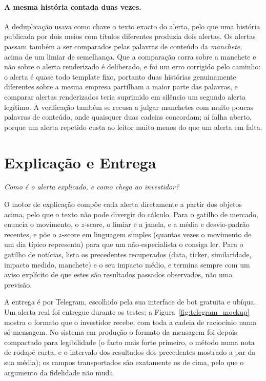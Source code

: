 \paragraph{A mesma história contada duas vezes.} A deduplicação usava como chave o texto exacto do
alerta, pelo que uma história publicada por dois meios com títulos diferentes produzia dois alertas.
Os alertas passam também a ser comparados pelas palavras de conteúdo da \emph{manchete}, acima de um
limiar de semelhança. Que a comparação corra sobre a manchete e não sobre o alerta renderizado é
deliberado, e foi um erro corrigido pelo caminho: o alerta é quase todo template fixo, portanto duas
histórias genuinamente diferentes sobre a mesma empresa partilham a maior parte das palavras, e
comparar alertas renderizados teria suprimido em silêncio um segundo alerta legítimo. A verificação
também se recusa a julgar manchetes com muito poucas palavras de conteúdo, onde quaisquer duas
cadeias concordam; aí falha aberto, porque um alerta repetido custa ao leitor muito menos do que um
alerta em falta.

\section{Explicação e Entrega}
\label{sec:investigator_xai}

\emph{Como é o alerta explicado, e como chega ao investidor?}

O motor de explicação compõe cada alerta diretamente a partir dos objetos acima, pelo que o texto não pode
divergir do cálculo. Para o gatilho de mercado, enuncia o movimento, o $z$-score, o limiar e a janela, e a
média e desvio-padrão recentes, e põe o $z$-score em linguagem simples (quantas vezes o movimento de um dia
típico representa) para que um não-especialista o consiga ler. Para o gatilho de notícias, lista os
precedentes recuperados (data, ticker, similaridade, impacto medido, manchete) e o seu impacto médio, e
termina sempre com um aviso explícito de que estes são resultados passados observados, não uma previsão.

A entrega é por Telegram, escolhido pela sua interface de bot gratuita e ubíqua. Um alerta real foi entregue
durante os testes; a Figura~\ref{fig:telegram_mockup} mostra o formato que o investidor recebe, com toda a
cadeia de raciocínio numa só mensagem. No sistema em produção o formato da mensagem foi depois compactado
para legibilidade (o facto mais forte primeiro, o método numa nota de rodapé curta, e o intervalo dos
resultados dos precedentes mostrado a par da sua média); os campos transportados são exatamente os de cima,
pelo que o argumento da fidelidade não muda.


